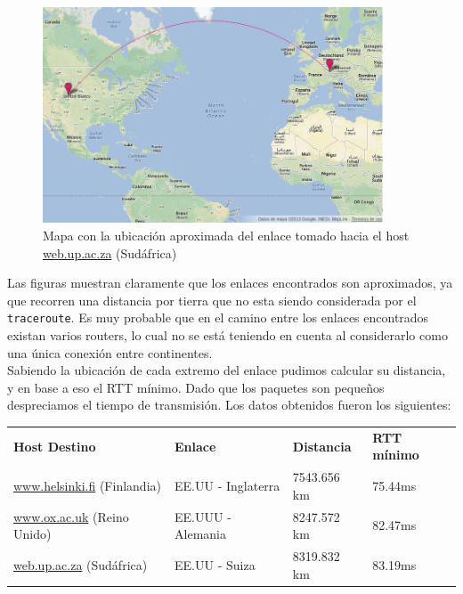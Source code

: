 \begin{figure}[H]
  \centering
    \includegraphics[width=0.9\textwidth]{imgs/sudafrica_enlace_1.png}
    \caption{Mapa con la ubicación aproximada del enlace tomado hacia el host \url{web.up.ac.za} (Sud\'africa)}
    \label{fig:mapa_sud}
\end{figure}

Las figuras muestran claramente que los enlaces encontrados son aproximados, ya que recorren una distancia por tierra que no esta siendo considerada por el \texttt{traceroute}. Es muy probable que en el camino entre los enlaces encontrados existan varios routers, lo cual no se est\'a teniendo en cuenta al considerarlo como una única conexión entre continentes.\\

Sabiendo la ubicaci\'on de cada extremo del enlace pudimos calcular su distancia, y en base a eso el RTT mínimo. Dado que los paquetes son pequeños despreciamos el tiempo de transmisión. Los datos obtenidos fueron los siguientes:

\begin{center}
\begin{tabular}{l l l  l}
  \label{tabla1}
 \textbf{Host Destino} & \textbf{Enlace} & \textbf{Distancia} & \textbf{RTT mínimo} \\
 \url{www.helsinki.fi} (Finlandia) & EE.UU - Inglaterra & 7543.656 km & 75.44ms\\
 \url{www.ox.ac.uk} (Reino Unido) & EE.UUU - Alemania & 8247.572 km & 82.47ms \\
 \url{web.up.ac.za} (Sud\'africa) & EE.UU - Suiza & 8319.832 km & 83.19ms \\
\end{tabular}
\end{center}

